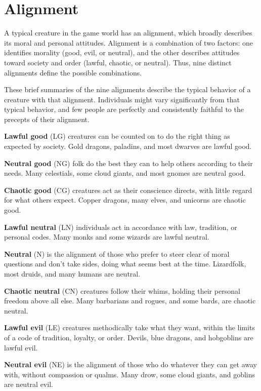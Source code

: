 \documentclass[
]{article}
\date{}
\begin{document}
\hypertarget{alignment}{%
\section{Alignment}\label{alignment}}

A typical creature in the game world has an alignment, which broadly
describes its moral and personal attitudes. Alignment is a combination
of two factors: one identifies morality (good, evil, or neutral), and
the other describes attitudes toward society and order (lawful, chaotic,
or neutral). Thus, nine distinct alignments define the possible
combinations.

These brief summaries of the nine alignments describe the typical
behavior of a creature with that alignment. Individuals might vary
significantly from that typical behavior, and few people are perfectly
and consistently faithful to the precepts of their alignment.

\textbf{Lawful good} (LG) creatures can be counted on to do the right
thing as expected by society. Gold dragons, paladins, and most dwarves
are lawful good.

\textbf{Neutral good} (NG) folk do the best they can to help others
according to their needs. Many celestials, some cloud giants, and most
gnomes are neutral good.

\textbf{Chaotic good} (CG) creatures act as their conscience directs,
with little regard for what others expect. Copper dragons, many elves,
and unicorns are chaotic good.

\textbf{Lawful neutral} (LN) individuals act in accordance with law,
tradition, or personal codes. Many monks and some wizards are lawful
neutral.

\textbf{Neutral} (N) is the alignment of those who prefer to steer clear
of moral questions and don't take sides, doing what seems best at the
time. Lizardfolk, most druids, and many humans are neutral.

\textbf{Chaotic neutral} (CN) creatures follow their whims, holding
their personal freedom above all else. Many barbarians and rogues, and
some bards, are chaotic neutral.

\textbf{Lawful evil} (LE) creatures methodically take what they want,
within the limits of a code of tradition, loyalty, or order. Devils,
blue dragons, and hobgoblins are lawful evil.

\textbf{Neutral evil} (NE) is the alignment of those who do whatever
they can get away with, without compassion or qualms. Many drow, some
cloud giants, and goblins are neutral evil.
\end{document}
